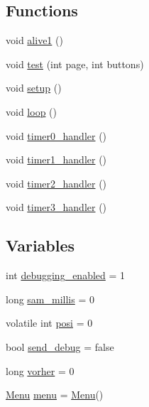 \subsection*{Functions}
\begin{DoxyCompactItemize}
\item 
void \hyperlink{ledquencer_8ino_a92c00e5adb1836741614c6492982e306}{alive1} ()
\item 
void \hyperlink{ledquencer_8ino_a859467c5035bc8e63b57dfe199caec30}{test} (int page, int buttons)
\item 
void \hyperlink{ledquencer_8ino_a4fc01d736fe50cf5b977f755b675f11d}{setup} ()
\item 
void \hyperlink{ledquencer_8ino_afe461d27b9c48d5921c00d521181f12f}{loop} ()
\item 
void \hyperlink{ledquencer_8ino_a36f33b2b623ea070c4ebccc7464ef489}{timer0\-\_\-handler} ()
\item 
void \hyperlink{ledquencer_8ino_a859aab5acbfa52240ec73ba136fb6bf3}{timer1\-\_\-handler} ()
\item 
void \hyperlink{ledquencer_8ino_a7cbb97684327369274bcf81b967c3a6b}{timer2\-\_\-handler} ()
\item 
void \hyperlink{ledquencer_8ino_a21338471d58456b6ec2c6b0070e44d67}{timer3\-\_\-handler} ()
\end{DoxyCompactItemize}
\subsection*{Variables}
\begin{DoxyCompactItemize}
\item 
int \hyperlink{ledquencer_8ino_a0f5109855ecd58cd3b97d093ac9815f2}{debugging\-\_\-enabled} = 1
\item 
long \hyperlink{ledquencer_8ino_a52bbd9d1a2fe4882a744f1e7092f5d99}{sam\-\_\-millis} = 0
\item 
volatile int \hyperlink{ledquencer_8ino_a58398a8d155ae453dfb8b9934f63484d}{posi} = 0
\item 
bool \hyperlink{ledquencer_8ino_a6009df3a7743868edbf59608b4781190}{send\-\_\-debug} = false
\item 
long \hyperlink{ledquencer_8ino_a4c14e9bc13ac36ecb3331ff5bb765816}{vorher} = 0
\item 
\hyperlink{classMenu}{Menu} \hyperlink{ledquencer_8ino_a2ad0f4be462ff63c3c72779e80988d15}{menu} = \hyperlink{classMenu}{Menu}()
\end{DoxyCompactItemize}


